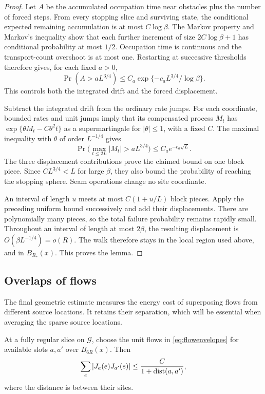 \begin{proof}
Let $A$ be the accumulated occupation time near obstacles plus the
number of forced steps.  From every stopping slice and surviving
state, the conditional expected remaining accumulation is at most
$C\log\beta$.  The Markov property and Markov's inequality show
that each further increment of size $2C\log\beta+1$ has conditional
probability at most $1/2$.  Occupation time is continuous and the
transport-count overshoot is at most one.  Restarting at successive
thresholds therefore gives, for each fixed $a>0$,
\[
 \Pr(A>aL^{3/4})\le C_a
        \exp\{-c_aL^{3/4}/\log\beta\}.
\]
This controls both the integrated drift and the forced displacement.

Subtract the integrated drift from the ordinary rate jumps.  For each
coordinate, bounded rates and unit jumps imply that its compensated
process $M_t$ has
$\exp\{\theta M_t-C\theta^2t\}$ as a supermartingale for
$|\theta|\le1$, with a fixed $C$.  The maximal inequality with
$\theta$ of order $L^{-1/4}$ gives
\[
 \Pr\bigl(\max_{t\le2L}|M_t|>aL^{3/4}\bigr)
                                  \le C_a e^{-c_a\sqrt L}.
\]
The three displacement contributions prove the claimed bound on one
block piece.  Since $CL^{3/4}<L$ for large $\beta$, they also bound
the probability of reaching the stopping sphere.  Seam operations
change no site coordinate.

An interval of length $u$ meets at most $C(1+u/L)$ block pieces.
Apply the preceding uniform bound successively and add their
displacements.  There are polynomially many pieces, so the total
failure probability remains rapidly small.  Throughout an interval
of length at most $2\beta$, the resulting displacement is
$O(\beta L^{-1/4})=o(R)$.  The walk therefore stays in the local
region used above, and in $B_{R_*}(x)$.  This proves the lemma.
\end{proof}

\subsection{Overlaps of flows}

The final geometric estimate measures the energy cost of superposing
flows from different source locations.  It retains their separation,
which will be essential when averaging the sparse source locations.

\begin{lemma}\label{lem:flowoverlap}
At a fully regular slice on $\mathcal G$, choose the unit flows in
\eqref{eq:flowenvelopes} for available slots $a,a'$ over $B_{6R}(x)$.
Then
\begin{equation}\label{eq:flowoverlap}
 \sum_e|J_a(e)J_{a'}(e)|
       \le\frac{C}{1+\operatorname{dist}(a,a')},
\end{equation}
where the distance is between their sites.
\end{lemma}

